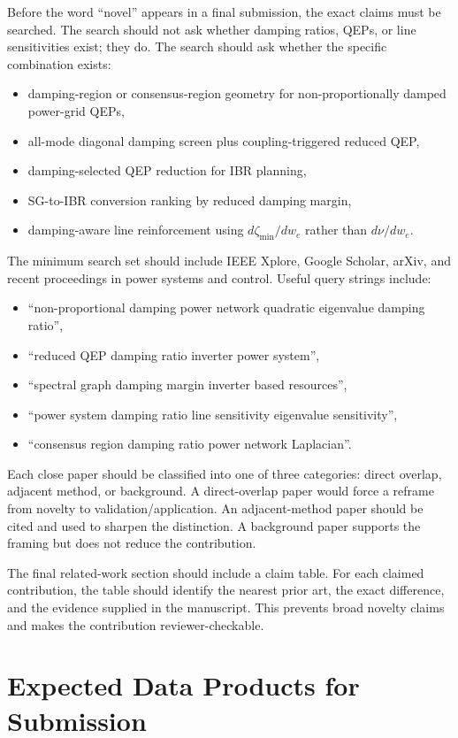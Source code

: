 \documentclass[journal]{IEEEtran}
\begin{document}
Before the word ``novel'' appears in a final submission, the exact claims must be searched. The search should not ask whether damping ratios, QEPs, or line sensitivities exist; they do. The search should ask whether the specific combination exists:
\begin{itemize}
\item damping-region or consensus-region geometry for non-proportionally damped power-grid QEPs,
\item all-mode diagonal damping screen plus coupling-triggered reduced QEP,
\item damping-selected QEP reduction for IBR planning,
\item SG-to-IBR conversion ranking by reduced damping margin,
\item damping-aware line reinforcement using $d\zeta_{\min}/dw_e$ rather than $d\nu/dw_e$.
\end{itemize}
The minimum search set should include IEEE Xplore, Google Scholar, arXiv, and recent proceedings in power systems and control. Useful query strings include:
\begin{itemize}
\item ``non-proportional damping power network quadratic eigenvalue damping ratio'',
\item ``reduced QEP damping ratio inverter power system'',
\item ``spectral graph damping margin inverter based resources'',
\item ``power system damping ratio line sensitivity eigenvalue sensitivity'',
\item ``consensus region damping ratio power network Laplacian''.
\end{itemize}
Each close paper should be classified into one of three categories: direct overlap, adjacent method, or background. A direct-overlap paper would force a reframe from novelty to validation/application. An adjacent-method paper should be cited and used to sharpen the distinction. A background paper supports the framing but does not reduce the contribution.

The final related-work section should include a claim table. For each claimed contribution, the table should identify the nearest prior art, the exact difference, and the evidence supplied in the manuscript. This prevents broad novelty claims and makes the contribution reviewer-checkable.

\section{Expected Data Products for Submission}
\end{document}
